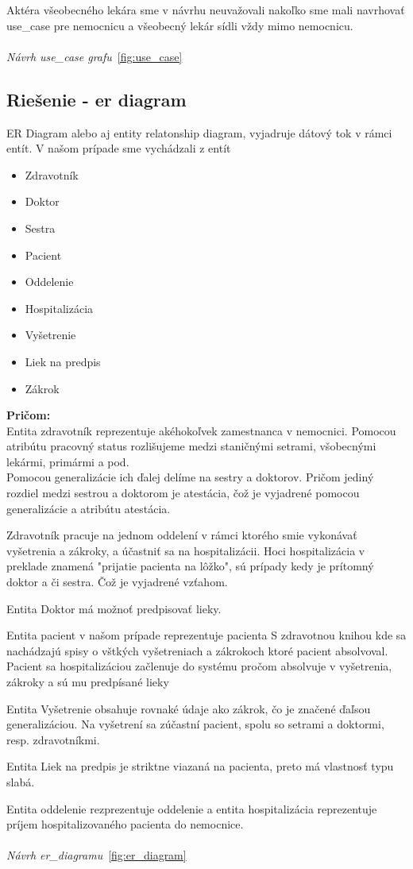 Aktéra všeobecného lekára sme v návrhu neuvažovali nakoľko sme mali navrhovať use\_case pre nemocnicu a všeobecný lekár
sídli vždy mimo nemocnicu.
\\\\
\textit{Návrh use\_case grafu}~\ref{fig:use_case}

\subsection{Riešenie - er diagram}
ER Diagram alebo aj entity relatonship diagram, vyjadruje dátový tok v rámci entít.
V našom prípade sme vychádzali z entít

\begin{itemize}
    \item Zdravotník
    \item Doktor
    \item Sestra
    \item Pacient
    \item Oddelenie
    \item Hospitalizácia
    \item Vyšetrenie
    \item Liek na predpis
    \item Zákrok
\end{itemize}

\noindent\textbf{Pričom:} \\
\indent Entita zdravotník reprezentuje akéhokoľvek zamestnanca v nemocnici. Pomocou atribútu pracovný status rozlišujeme medzi staničnými setrami,
všobecnými lekármi, primármi a pod. \\
Pomocou generalizácie ich ďalej delíme na sestry a doktorov. Pričom jediný rozdiel medzi sestrou a doktorom je atestácia, čož
je vyjadrené pomocou generalizácie a atribútu atestácia.

Zdravotník pracuje na jednom oddelení v rámci ktorého smie vykonávať vyšetrenia a zákroky, a účastniť sa na hospitalizácii.
Hoci hospitalizácia v preklade znamená "prijatie pacienta na lôžko", sú prípady kedy je prítomný doktor a či sestra. Čož
je vyjadrené vzťahom.

Entita Doktor má možnoť predpisovať lieky.

Entita pacient v našom prípade reprezentuje pacienta S zdravotnou knihou kde sa nachádzajú spisy o vštkých vyšetreniach a zákrokoch ktoré pacient
absolvoval.
Pacient sa hospitalizáciou začlenuje do systému pročom absolvuje v vyšetrenia, zákroky a sú mu predpísané lieky

Entita Vyšetrenie obsahuje rovnaké údaje ako zákrok, čo je značené ďaľsou generalizáciou.
Na vyšetrení sa zúčastní pacient, spolu so setrami a doktormi, resp. zdravotníkmi.

Entita Liek na predpis je striktne viazaná na pacienta, preto má vlastnosť  typu slabá.

Entita oddelenie rezprezentuje oddelenie a entita hospitalizácia reprezentuje príjem hospitalizovaného pacienta do nemocnice.
\\\\
\textit{Návrh er\_diagramu}~\ref{fig:er_diagram}
\newpage


